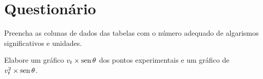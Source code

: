 \cleardoublepage


\vspace{15mm}

\begin{fullwidth}
\noindent{}
\vspace{5mm}

\noindent{}

\noindent{}

\noindent{}

\noindent{}

\noindent{}
\end{fullwidth}

\vspace{5mm}

\section{Questionário}

\begin{question}[type={exam}]
Preencha as colunas de dados das tabelas com o número adequado de algarismos significativos e unidades.
\end{question}


\begin{question}[type={exam}]
Elabore um gráfico $v_t \times \operatorname{sen}\theta$ dos pontos experimentais e um gráfico de $v_t^2 \times \operatorname{sen}\theta$.
\end{question}

